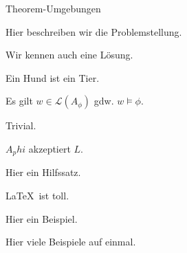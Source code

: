 \documentclass{beamer}
\begin{document}
  \begin{frame}[allowframebreaks]{Theorem-Umgebungen}
    \begin{Problem}
      Hier beschreiben wir die Problemstellung.
    \end{Problem}

    \begin{Loesung}
      Wir kennen auch eine Lösung.
    \end{Loesung}

    \begin{Definition}
      Ein Hund ist ein Tier.
    \end{Definition}

    \begin{Satz}
      Es gilt $w \in \mathcal L(A_\phi)$ gdw. $w \models \phi$.
    \end{Satz}

    \begin{Beweis}
      Trivial.
    \end{Beweis}

    \begin{Folgerung}
      $A_phi$ akzeptiert $L$.
    \end{Folgerung}

    \framebreak

    \begin{Lemma}
      Hier ein Hilfssatz.
    \end{Lemma}

    \begin{Fakt}
      \LaTeX\ ist toll.
    \end{Fakt}

    \begin{Beispiel}
      Hier ein Beispiel.
    \end{Beispiel}

    \begin{Beispiele}
      Hier viele Beispiele auf einmal.
    \end{Beispiele}
  \end{frame}
\end{document}
